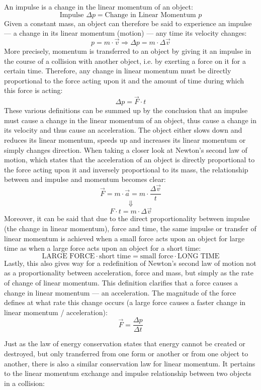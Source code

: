 An impulse is a change in the linear momentum of an object: $$\text{Impulse } \Delta p = \text{Change in Linear Momentum } p$$ Given a constant mass, an object can therefore be said to experience an impulse --- a change in its linear momentum (motion) --- any time its velocity changes: $$p = m \cdot \vec{v} \Rightarrow \Delta p = m \cdot \Delta \vec{v}$$ More precisely, momentum is transferred to an object by giving it an impulse in the course of a collision with another object, i.e. by exerting a force on it for a certain time. Therefore, any change in linear momentum must be directly proportional to the force acting upon it and the amount of time during which this force is acting: $$\Delta p = \vec{F} \cdot t$$ These various definitions can be summed up by the conclusion that an impulse must cause a change in the linear momentum of an object, thus cause a change in its velocity and thus cause an acceleration. The object either slows down and reduces its linear momentum, speeds up and increases its linear momentum or simply changes direction. When taking a closer look at Newton's second law of motion, which states that the acceleration of an object is directly proportional to the force acting upon it and inversely proportional to its mass, the relationship between and impulse and momentum becomes clear: $$\vec{F} = m \cdot \vec{a} = m \cdot \frac{\Delta \vec{v}}{t}$$ $$\Downarrow$$ $$F \cdot t = m \cdot \Delta \vec{v}$$ Moreover, it can be said that due to the direct proportionality between impulse (the change in linear momentum), force and time, the same impulse or transfer of linear momentum is achieved when a small force acts upon an object for large time as when a large force acts upon an object for a short time: $$\text{LARGE FORCE} \cdot \text{short time} = \text{small force} \cdot \text{LONG TIME}$$ Lastly, this also gives way for a redefinition of Newton's second law of motion not as a proportionality between acceleration, force and mass, but simply as the rate of change of linear momentum. This definition clarifies that a force causes a change in linear momentum --- an acceleration. The magnitude of the force defines at what rate this change occurs (a large force causes a faster change in linear momentum / acceleration): $$\vec{F} = \frac{\Delta p}{\Delta t}$$


Just as the law of energy conservation states that energy cannot be created or destroyed, but only transferred from one form or another or from one object to another, there is also a similar conservation law for linear momentum. It pertains to the linear momentum exchange and impulse relationship between two objects in a collision:

